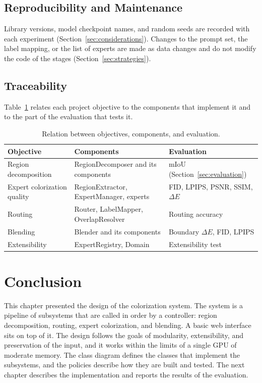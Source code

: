 \documentclass{FastFyp}
\begin{document}
\subsection{Reproducibility and Maintenance}

Library versions, model checkpoint names, and random seeds are recorded with each experiment (Section~\ref{sec:considerations}). Changes to the prompt set, the label mapping, or the list of experts are made as data changes and do not modify the code of the stages (Section~\ref{sec:strategies}).

\subsection{Traceability}

Table~\ref{tab:traceability} relates each project objective to the components that implement it and to the part of the evaluation that tests it.

\begin{table}[htbp]
    \centering
    \caption{Relation between objectives, components, and evaluation.}
    \label{tab:traceability}
    \begin{tabular}{p{3.4cm}p{5.4cm}p{4.2cm}}
        \hline
        \textbf{Objective} & \textbf{Components} & \textbf{Evaluation} \\
        \hline
        Region decomposition & RegionDecomposer and its components & mIoU (Section~\ref{sec:evaluation}) \\
        Expert colorization quality & RegionExtractor, ExpertManager, experts & FID, LPIPS, PSNR, SSIM, $\Delta E$ \\
        Routing & Router, LabelMapper, OverlapResolver & Routing accuracy \\
        Blending & Blender and its components & Boundary $\Delta E$, FID, LPIPS \\
        Extensibility & ExpertRegistry, Domain & Extensibility test \\
        \hline
    \end{tabular}
\end{table}

\section*{Conclusion}

This chapter presented the design of the colorization system. The system is a pipeline of subsystems that are called in order by a controller: region decomposition, routing, expert colorization, and blending. A basic web interface sits on top of it. The design follows the goals of modularity, extensibility, and preservation of the input, and it works within the limits of a single GPU of moderate memory. The class diagram defines the classes that implement the subsystems, and the policies describe how they are built and tested. The next chapter describes the implementation and reports the results of the evaluation.
\end{document}

